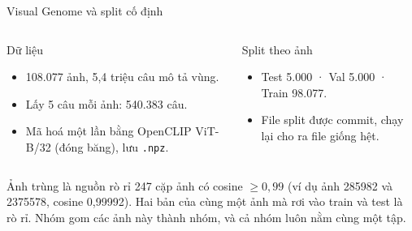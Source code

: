 \documentclass[10pt, aspectratio=169]{beamer}
\newcommand{\code}[1]{\texttt{#1}}
\begin{document}
\begin{frame}{Visual Genome và split cố định}
  \begin{columns}[T]
      \begin{block}{Dữ liệu}
        \begin{itemize}
          \item 108.077 ảnh, 5,4 triệu câu mô tả vùng.
          \item Lấy 5 câu mỗi ảnh: 540.383 câu.
          \item Mã hoá một lần bằng OpenCLIP ViT-B/32 (đóng băng), lưu \code{.npz}.
        \end{itemize}
      \end{block}
      \begin{block}{Split theo ảnh}
        \begin{itemize}
          \item Test 5.000 · Val 5.000 · Train 98.077.
          \item File split được commit, chạy lại cho ra file giống hệt.
        \end{itemize}
      \end{block}
  \end{columns}
  \begin{alertblock}{Ảnh trùng là nguồn rò rỉ}
    247 cặp ảnh có cosine $\ge 0{,}99$ (ví dụ ảnh 285982 và 2375578, cosine 0,99992). Hai bản của cùng một ảnh mà rơi vào train và test là rò rỉ. Nhóm gom các ảnh này thành nhóm, và cả nhóm luôn nằm cùng một tập.
  \end{alertblock}
\end{frame}
\end{document}

